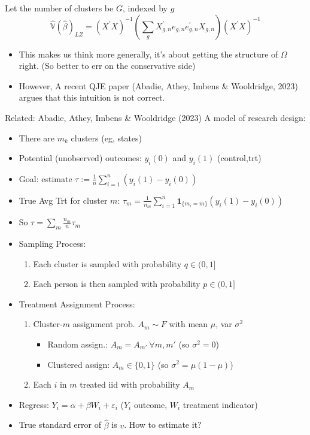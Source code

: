 \begin{frame}
Let the number of clusters be $G$, indexed by $g$
    \begin{equation}
        \hat{\mathbb{V}}(\hat{\beta})_{LZ}=(X^{\prime}X)^{-1}\left(\sum_{g} X^{\prime}_{g,n}e_{g,n}e^{\prime}_{g,n}X_{g,n}\right)(X^{\prime}X)^{-1} \tag{Liang \& Zeger, 1986}
    \end{equation}
\begin{itemize}
    \item This makes us think more generally, it's about getting the structure of $\Omega$ right. (So better to err on the conservative side)
    \item However, A recent QJE paper (Abadie, Athey, Imbens \& Wooldridge, 2023) argues that this intuition is not correct.
\end{itemize}
\end{frame}


\begin{frame}{Related: Abadie, Athey, Imbens \& Wooldridge
(2023)}
A model of research design:
\begin{itemize}
    \item There are $m_k$ clusters (eg, states)
    \item Potential (unobserved) outcomes: $y_{i}(0)$ and $y_{i}(1)$ (control,trt)
    \item Goal: estimate $\tau :=\frac{1}{n}\sum_{i=1}^n (y_i(1)-y_i(0))$
    \item True Avg Trt for cluster $m$: $\tau_m=\frac{1}{n_m}\sum_{i=1}^n \mathbf{1}_{\{m_i=m\}}(y_i(1)-y_i(0))$
    \item So $\tau = \sum_{m}\frac{n_m}{n}\tau_m$
    \item Sampling Process:
    \begin{enumerate}
        \item Each cluster is sampled with probability $q\in (0,1]$
        \item Each person is then sampled with probability $p\in(0,1]$
    \end{enumerate}
    \item Treatment Assignment Process:
    \begin{enumerate}
        \item Cluster-$m$ assignment prob. $A_m\sim F$ with mean $\mu$, var $\sigma^2$
        \begin{itemize}
            \item Random assign.: $A_m=A_{m'}\ \forall m,m'$ (so $\sigma^2=0$)
            \item Clustered assign: $A_m\in\{0,1\}$ (so $\sigma^2=\mu(1-\mu)$)
        \end{itemize}
        \item Each $i$ in $m$ treated iid with probability $A_m$
    \end{enumerate}
    \item Regress: $Y_i=\alpha+\beta W_i + \varepsilon_i$ ($Y_i$ outcome, $W_i$ treatment indicator)
    \item True standard error of $\hat{\beta}$ is $v$. How to estimate it?
\end{itemize}
\end{frame}

